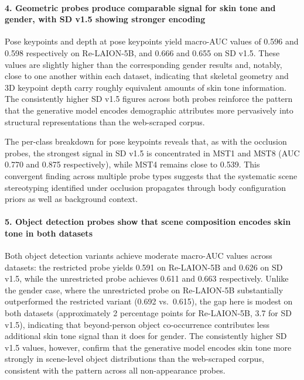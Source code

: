 \paragraph{4. Geometric probes produce comparable signal for skin tone and gender, with
	SD v1.5 showing stronger encoding}

Pose keypoints and depth at pose keypoints yield macro-AUC values of 0.596 and 0.598
respectively on Re-LAION-5B, and 0.666 and 0.655 on SD v1.5. These values are slightly
higher than the corresponding gender results and, notably, close to one another within
each dataset, indicating that skeletal geometry and 3D keypoint depth carry roughly
equivalent amounts of skin tone information. The consistently higher SD v1.5 figures
across both probes reinforce the pattern that the generative model encodes demographic
attributes more pervasively into structural representations than the web-scraped corpus.

The per-class breakdown for pose keypoints reveals that, as with the occlusion probes,
the strongest signal in SD v1.5 is concentrated in MST1 and MST8 (AUC 0.770 and 0.875
respectively), while MST4 remains close to 0.539. This convergent finding across multiple
probe types suggests that the systematic scene stereotyping identified under occlusion
propagates through body configuration priors as well as background context.

\paragraph{5. Object detection probes show that scene composition encodes skin tone in
	both datasets}

Both object detection variants achieve moderate macro-AUC values across datasets:
the restricted probe yields 0.591 on Re-LAION-5B and 0.626 on SD v1.5, while the
unrestricted probe achieves 0.611 and 0.663 respectively. Unlike the gender case, where
the unrestricted probe on Re-LAION-5B substantially outperformed the restricted variant
(0.692 vs.\ 0.615), the gap here is modest on both datasets (approximately 2 percentage
points for Re-LAION-5B, 3.7 for SD v1.5), indicating that beyond-person object
co-occurrence contributes less additional skin tone signal than it does for gender. The
consistently higher SD v1.5 values, however, confirm that the generative model encodes
skin tone more strongly in scene-level object distributions than the web-scraped corpus,
consistent with the pattern across all non-appearance probes.

